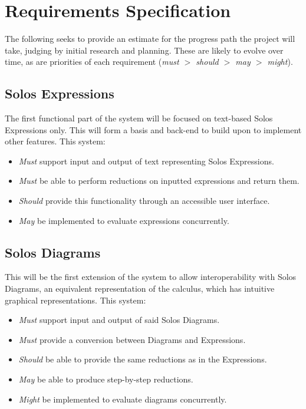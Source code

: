 \documentclass{article}
\begin{document}
\section{Requirements Specification}
The following seeks to provide an estimate for the progress path the project will take, judging by initial research and planning. These are likely to evolve over time, as are priorities of each requirement (\textit{must $>$ should $>$ may $>$ might}).

\subsection{Solos Expressions}\label{subsec:reqs_solo_expr}
The first functional part of the system will be focused on text-based Solos Expressions only. This will form a basis and back-end to build upon to implement other features.
This system:
\begin{itemize}
	\item \textit{Must} support input and output of text representing Solos Expressions.
	\item \textit{Must} be able to perform reductions on inputted expressions and return them.
	\item \textit{Should} provide this functionality through an accessible user interface.
	\item \textit{May} be implemented to evaluate expressions concurrently.
\end{itemize}

\subsection{Solos Diagrams}
This will be the first extension of the system to allow interoperability with Solos Diagrams, an equivalent representation of the calculus, which has intuitive graphical representations.
This system:
\begin{itemize}
	\item \textit{Must} support input and output of said Solos Diagrams.
	\item \textit{Must} provide a conversion between Diagrams and Expressions.
	\item \textit{Should} be able to provide the same reductions as in the Expressions.
	\item \textit{May} be able to produce step-by-step reductions.
	\item \textit{Might} be implemented to evaluate diagrams concurrently.
\end{itemize}
\end{document}
